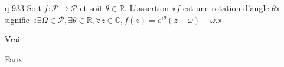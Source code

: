\begin{truefalse}{q-933}
Soit $f:\mathcal P\to \mathcal P$ et soit $\theta\in\mathbb R$. L'assertion «$f$ est une rotation d'angle $\theta$» signifie «$\exists \Omega\in\mathcal P, \exists \theta\in\mathbb R, \forall z\in\mathbb C, \tilde f(z)=e^{i\theta}(z-\omega)+\omega$.»
\item Vrai
\item* Faux
\end{truefalse}

